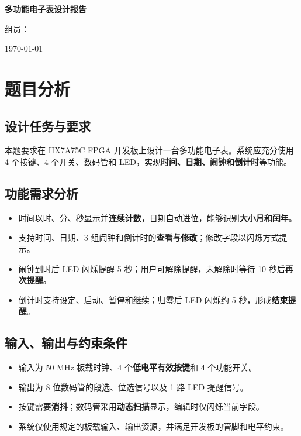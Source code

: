 \documentclass[12pt,a4paper]{ctexart}
\begin{document}
\begin{titlepage}
    \centering
    \vspace*{3cm}

    {\Huge\bfseries 多功能电子表设计报告\par}
    \vspace{1.5cm}
    \vfill

    {\large 组员：\underline{}\par}
    \vfill

    {\large \today\par}
\end{titlepage}

\tableofcontents
\clearpage

\section{题目分析}

\subsection{设计任务与要求}

本题要求在 HX7A75C FPGA 开发板上设计一台多功能电子表。系统应充分使用 4 个按键、4 个开关、数码管和 LED，实现\textbf{时间、日期、闹钟和倒计时}等功能。

\subsection{功能需求分析}

\begin{itemize}
    \item 时间以时、分、秒显示并\textbf{连续计数}，日期自动进位，能够识别\textbf{大小月和闰年}。
    \item 支持时间、日期、3 组闹钟和倒计时的\textbf{查看与修改}；修改字段以闪烁方式提示。
    \item 闹钟到时后 LED 闪烁提醒 5 秒；用户可解除提醒，未解除时等待 10 秒后\textbf{再次提醒}。
    \item 倒计时支持设定、启动、暂停和继续；归零后 LED 闪烁约 5 秒，形成\textbf{结束提醒}。
\end{itemize}

\subsection{输入、输出与约束条件}

\begin{itemize}
    \item 输入为 50 MHz 板载时钟、4 个\textbf{低电平有效按键}和 4 个功能开关。
    \item 输出为 8 位数码管的段选、位选信号以及 1 路 LED 提醒信号。
    \item 按键需要\textbf{消抖}；数码管采用\textbf{动态扫描}显示，编辑时仅闪烁当前字段。
    \item 系统仅使用规定的板载输入、输出资源，并满足开发板的管脚和电平约束。
\end{itemize}
\end{document}

